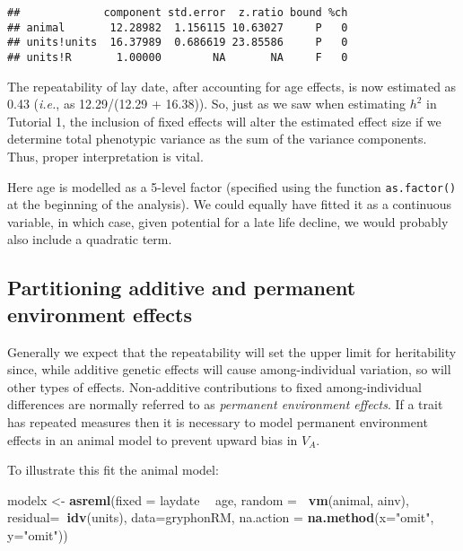 \documentclass[12pt,]{book}
\newenvironment{Shaded}{\begin{snugshade}}{\end{snugshade}}
\newcommand{\DataTypeTok}[1]{\textcolor[rgb]{0.13,0.29,0.53}{#1}}
\newcommand{\KeywordTok}[1]{\textcolor[rgb]{0.13,0.29,0.53}{\textbf{#1}}}
\newcommand{\NormalTok}[1]{#1}
\newcommand{\OperatorTok}[1]{\textcolor[rgb]{0.81,0.36,0.00}{\textbf{#1}}}
\newcommand{\StringTok}[1]{\textcolor[rgb]{0.31,0.60,0.02}{#1}}
\begin{document}
\begin{Shaded}
\end{Shaded}

\begin{verbatim}
##             component std.error  z.ratio bound %ch
## animal       12.28982  1.156115 10.63027     P   0
## units!units  16.37989  0.686619 23.85586     P   0
## units!R       1.00000        NA       NA     F   0
\end{verbatim}

The repeatability of lay date, after accounting for age effects, is now estimated as 0.43 (\emph{i.e.}, as 12.29/(12.29 + 16.38)). So, just as we saw when estimating \(h^2\) in Tutorial 1, the inclusion of fixed effects will alter the estimated effect size if we determine total phenotypic variance as the sum of the variance components. Thus, proper interpretation is vital.

Here age is modelled as a 5-level factor (specified using the function \texttt{as.factor()} at the beginning of the analysis). We could equally have fitted it as a continuous variable, in which case, given potential for a late life decline, we would probably also include a quadratic term.

\hypertarget{partitioning-additive-and-permanent-environment-effects}{%
\subsection{Partitioning additive and permanent environment effects}\label{partitioning-additive-and-permanent-environment-effects}}

Generally we expect that the repeatability will set the upper limit for heritability since, while additive genetic effects will cause among-individual variation, so will other types of effects. Non-additive contributions to fixed among-individual differences are normally referred to as \emph{permanent environment effects}. If a trait has repeated measures then it is necessary to model permanent environment effects in an animal model to prevent upward bias in \(V_A\).

To illustrate this fit the animal model:

\begin{Shaded}
\begin{Highlighting}[]
\NormalTok{modelx <-}\StringTok{ }\KeywordTok{asreml}\NormalTok{(}\DataTypeTok{fixed =}\NormalTok{ laydate }\OperatorTok{~}\StringTok{ }\NormalTok{age,}
                 \DataTypeTok{random =}\OperatorTok{~}\StringTok{ }\KeywordTok{vm}\NormalTok{(animal, ainv),}
                 \DataTypeTok{residual=}\OperatorTok{~}\KeywordTok{idv}\NormalTok{(units),}
                 \DataTypeTok{data=}\NormalTok{gryphonRM,}
                 \DataTypeTok{na.action =} \KeywordTok{na.method}\NormalTok{(}\DataTypeTok{x=}\StringTok{"omit"}\NormalTok{, }\DataTypeTok{y=}\StringTok{"omit"}\NormalTok{))}
\end{Highlighting}
\end{Shaded}
\end{document}
